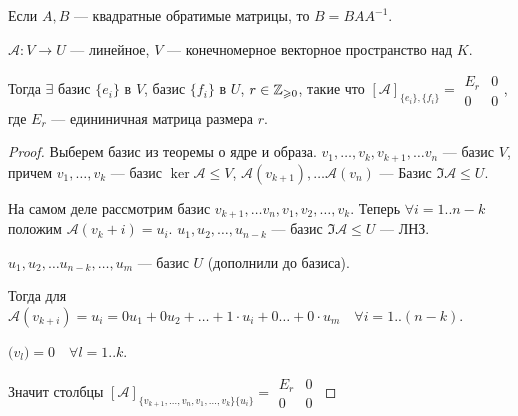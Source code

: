 Если $A, B$ --- квадратные обратимые матрицы, то $B = B A A^{-1}$.

\begin{theorem}
    $\mathcal{A}\!: V \to U$ --- линейное,  $V$ --- конечномерное векторное пространство над  $K$.

    Тогда $\exists$ базис $\{e_i\}$ в  $V$, базис  $\{f_i\}$ в  $U$,  $r \in \mathbb{Z}_{\geqslant 0}$, такие что $[\mathcal{A}]_{\{e_i\}, \{f_i\}} = \begin{array}{|c|c|} E_r & 0 \\ \hline 0 & 0 \end{array}$, где $E_r$ --- едининичная матрица размера  $r$.
\end{theorem}
\begin{proof}
    Выберем базис из теоремы о ядре и образа. $v_1, \ldots, v_k, v_{k+1}, \ldots v_n$ --- базис $V$, причем  $v_1, \ldots, v_k$ --- базис $\ker \mathcal{A} \le V$,  $\mathcal{A}(v_{k+1}), \ldots \mathcal{A}(v_n)$ --- Базис $\Im \mathcal{A} \le U$.

    На самом деле рассмотрим базис $v_{k+1}, \ldots v_n, v_1, v_2, \ldots, v_k$. Теперь $\forall i = 1..n - k$ положим $\mathcal{A}(v_k + i) = u_i$.  $u_1, u_2, \ldots, u_{n-k}$ --- базис $\Im \mathcal{A} \le U$ --- ЛНЗ.

    $u_1, u_2, \ldots u_{n-k}, \ldots, u_m$ --- базис $U$ (дополнили до базиса).

    Тогда для  $\mathcal{A}(v_{k+i}) = u_i = 0 u_1 + 0 u_2 + \ldots + 1 \cdot u_i + 0 \ldots + 0 \cdot u_m\quad \forall i = 1..(n-k)$.

    $\mathcal(v_l) = 0 \quad \forall l=1..k$.

    Значит столбцы  $[\mathcal{A}]_{\{v_{k+1}, \ldots, v_n, v_1,\ldots, v_k\} \{u_i\}} =  \begin{array}{|c|c|} E_r & 0 \\ \hline 0 & 0 \end{array}$
\end{proof}

